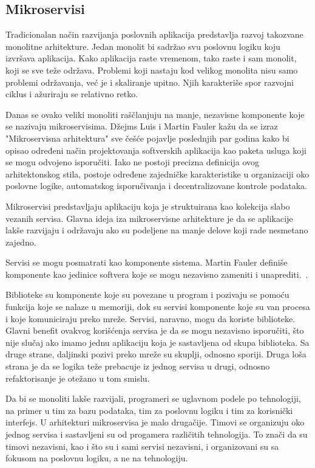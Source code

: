 \subsection{Mikroservisi}\label{sec:arhitektura-mikroservisi}

Tradicionalan način razvijanja poslovnih aplikacija predstavlja razvoj takozvane monolitne arhitekture. 
Jedan monolit bi sadržao svu poslovnu logiku koju izvršava aplikacija. Kako aplikacija raste vremenom, 
tako raste i sam monolit, koji se sve teže održava. Problemi koji nastaju kod velikog monolita nisu 
samo problemi održavanja, već je i skaliranje upitno. Njih karakteriše spor razvojni ciklus i ažuriraju se relativno retko.

Danas se ovako veliki monoliti raščlanjuju na manje, nezavisne komponente koje se nazivaju mikroservisima. 
Džejms Luis i Martin Fauler kažu da se izraz "Mikroservisna arhitektura" sve češće pojavlje poslednjih 
par godina kako bi opisao određeni način projektovanja softverskih aplikacija kao paketa usluga koji se 
mogu odvojeno isporučiti. Iako ne postoji precizna definicija ovog arhitektonskog stila, postoje određene 
zajedničke karakteristike u organizaciji oko poslovne logike, automatskog isporučivanja i decentralizovane 
kontrole podataka.~\cite{martinfowler_microservices} 

Mikroservisi predstavljaju aplikaciju koja je struktuirana kao kolekcija slabo vezanih servisa. Glavna 
ideja iza mikroservisne arhitekture je da se aplikacije lakše razvijaju i održavaju ako su podeljene 
na manje delove koji rade nesmetano zajedno.

Servisi se mogu posmatrati kao komponente sistema. Martin Fauler definiše komponente kao jedinice 
softvera koje se mogu nezavisno zameniti i unaprediti.~\cite{martinfowler_software_component}.

Biblioteke su komponente koje su povezane u program i pozivaju se pomoću funkcija koje se nalaze u 
memoriji, dok su servisi komponente koje su van procesa i koje komuniciraju preko mreže.
Servisi, naravno, mogu da koriste biblioteke. Glavni benefit ovakvog korišćenja servisa je da se mogu 
nezavisno isporučiti, što nije slučaj ako imamo jednu aplikaciju koja je sastavljena od skupa biblioteka.
Sa druge strane, daljinski pozivi preko mreže su skuplji, odnosno sporiji. 
Druga loša strana je da se logika teže prebacuje iz jednog servisa u drugi, odnosno refaktorisanje je 
otežano u tom smislu.

Da bi se monoliti lakše razvijali, programeri se uglavnom podele po tehnologiji, na primer u tim za 
bazu podataka, tim za poslovnu logiku i tim za korisnički interfejs. U arhitekturi mikroservisa je malo 
drugačije. Timovi se organizuju oko jednog servisa i sastavljeni su od progamera različitih tehnologija.
To znači da su timovi nezavisni, kao i što su i sami servisi nezavisni, i organizovani su sa fokusom na 
poslovnu logiku, a ne na tehnologiju.

